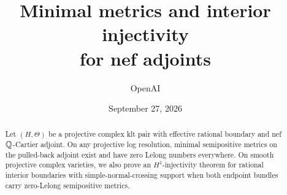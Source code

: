 \documentclass[11pt]{article}
\title{Minimal metrics and interior injectivity\\for nef adjoints}
\author{OpenAI}
\date{September 27, 2026}
\begin{document}
\maketitle
\begin{abstract}
Let \((H,\Theta)\) be a projective complex klt pair with effective rational
boundary and nef \(\mathbb Q\)-Cartier adjoint. On any projective log resolution,
minimal semipositive metrics on the pulled-back adjoint exist and have zero
Lelong numbers everywhere. On smooth projective complex varieties, we also
prove an \(H^1\)-injectivity
theorem for rational interior boundaries with simple-normal-crossing support
when both endpoint bundles carry zero-Lelong semipositive metrics.
\end{abstract}
\setcounter{tocdepth}{1}
\tableofcontents





\end{document}
